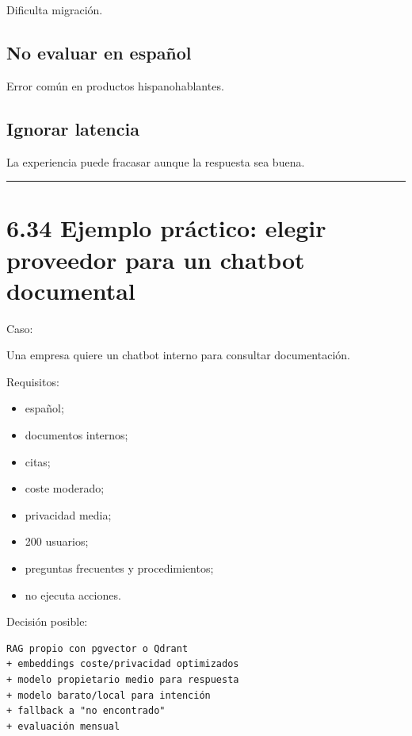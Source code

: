 Dificulta migración.

\subsection{No evaluar en español}\label{no-evaluar-en-espauxf1ol-1}

Error común en productos hispanohablantes.

\subsection{Ignorar latencia}\label{ignorar-latencia}

La experiencia puede fracasar aunque la respuesta sea buena.

\begin{center}\rule{0.5\linewidth}{0.5pt}\end{center}

\section{6.34 Ejemplo práctico: elegir proveedor para un chatbot
documental}\label{ejemplo-pruxe1ctico-elegir-proveedor-para-un-chatbot-documental}

Caso:

Una empresa quiere un chatbot interno para consultar documentación.

Requisitos:

\begin{itemize}
\tightlist
\item
  español;
\item
  documentos internos;
\item
  citas;
\item
  coste moderado;
\item
  privacidad media;
\item
  200 usuarios;
\item
  preguntas frecuentes y procedimientos;
\item
  no ejecuta acciones.
\end{itemize}

Decisión posible:

\begin{lstlisting}
RAG propio con pgvector o Qdrant
+ embeddings coste/privacidad optimizados
+ modelo propietario medio para respuesta
+ modelo barato/local para intención
+ fallback a "no encontrado"
+ evaluación mensual
\end{lstlisting}

